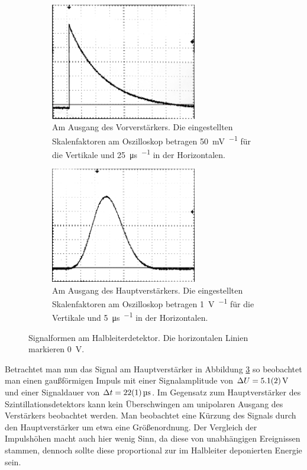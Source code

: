 \documentclass[11pt, a4paper]{article}
\numberwithin{equation}{section}
\begin{document}
\begin{figure}[h]
	\centering
	\begin{subfigure}[b]{0.7\textwidth}
		\centering
		\includegraphics[width=0.7\textwidth]{./figures/signale/vor_ger_abgeschnitten.jpg}
		\caption{Am Ausgang des Vorverstärkers. Die eingestellten Skalenfaktoren am Oszilloskop betragen \SI{50}{\milli\volt\per\division} für die Vertikale und \SI{25}{\micro\second\per\division} in der Horizontalen.}
		\label{fig:signal_ger_vor}
	\end{subfigure}

	\begin{subfigure}[b]{0.7\textwidth}
		\centering
		\includegraphics[width=0.7\textwidth]{./figures/signale/haupt_ger_abgeschnitten.jpg}
		\caption{Am Ausgang des Hauptverstärkers. Die eingestellten Skalenfaktoren am Oszilloskop betragen \SI{1}{\volt\per\division} für die Vertikale und \SI{5}{\micro\second\per\division} in der Horizontalen.}
		\label{fig:signal_ger_haupt}
	\end{subfigure}
	\caption{Signalformen am Halbleiterdetektor. Die horizontalen Linien markieren \SI{0}{\volt}.}
\end{figure}
Betrachtet man nun das Signal am Hauptverstärker in Abbildung \ref{fig:signal_ger_haupt} so beobachtet man einen gaußförmigen Impuls mit einer Signalamplitude von $\Delta U = \SI{5.1 +- 0.2}{\volt}$ und einer Signaldauer von $\Delta t = \SI{22 +- 1}{\micro\second}$.
Im Gegensatz zum Hauptverstärker des Szintillationsdetektors kann kein Überschwingen am unipolaren Ausgang des Verstärkers beobachtet werden.
Man beobachtet eine Kürzung des Signals durch den Hauptverstärker um etwa eine Größenordnung.
Der Vergleich der Impulshöhen macht auch hier wenig Sinn, da diese von unabhängigen Ereignissen stammen, dennoch sollte diese proportional zur im Halbleiter deponierten Energie sein.
\end{document}
